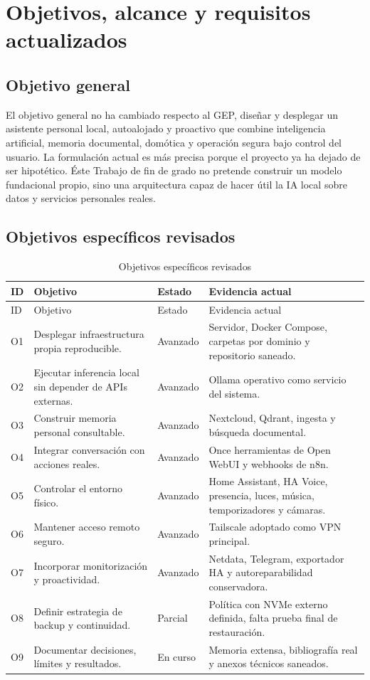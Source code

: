 \chapter{Objetivos, alcance y requisitos actualizados}

\section{Objetivo general}
El objetivo general no ha cambiado respecto al GEP, diseñar y desplegar un asistente personal local, autoalojado y proactivo que combine inteligencia artificial, memoria documental, domótica y operación segura bajo control del usuario. La formulación actual es más precisa porque el proyecto ya ha dejado de ser hipotético. Éste Trabajo de fin de grado no pretende construir un modelo fundacional propio, sino una arquitectura capaz de hacer útil la IA local sobre datos y servicios personales reales.

\section{Objetivos específicos revisados}
\begin{longtable}{p{}p{}p{}p{}}
  \caption{Objetivos específicos revisados}
  \label{tab:objetivos-revisados}\\
  \toprule
  ID & Objetivo & Estado & Evidencia actual \\
  \midrule
  \endfirsthead
  \toprule
  ID & Objetivo & Estado & Evidencia actual \\
  \midrule
  \endhead
  \bottomrule
  \endfoot
  O1 & Desplegar infraestructura propia reproducible. & Avanzado & Servidor, Docker Compose, carpetas por dominio y repositorio saneado. \\
  O2 & Ejecutar inferencia local sin depender de APIs externas. & Avanzado & Ollama operativo como servicio del sistema. \\
  O3 & Construir memoria personal consultable. & Avanzado & Nextcloud, Qdrant, ingesta y búsqueda documental. \\
  O4 & Integrar conversación con acciones reales. & Avanzado & Once herramientas de Open WebUI y webhooks de n8n. \\
  O5 & Controlar el entorno físico. & Avanzado & Home Assistant, HA Voice, presencia, luces, música, temporizadores y cámaras. \\
  O6 & Mantener acceso remoto seguro. & Avanzado & Tailscale adoptado como VPN principal. \\
  O7 & Incorporar monitorización y proactividad. & Avanzado & Netdata, Telegram, exportador HA y autoreparabilidad conservadora. \\
  O8 & Definir estrategia de backup y continuidad. & Parcial & Política con NVMe externo definida, falta prueba final de restauración. \\
  O9 & Documentar decisiones, límites y resultados. & En curso & Memoria extensa, bibliografía real y anexos técnicos saneados. \\
  \bottomrule
\end{longtable}


